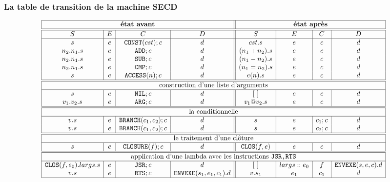 \documentclass[11pt]{book}
\begin{document}
\subsubsection{La table de transition de la machine SECD}
\begin{footnotesize}
\[
\begin{array}{|c|c|c|c || c|c|c|c|}
  \hline
  \multicolumn{4}{|c||}{\textbf{état avant}} & \multicolumn{4}{c|}{\textbf{état après}} \\
  \hline \hline
  S & E & C & D & S & E & C & D \\
  \hline
  
  s         & e & \texttt{CONST}(cst); c & d                & cst.s         & e & c &  d \\
  n_2.n_1.s & e & \texttt{ADD}; c        & d                & (n_1 + n_2).s & e & c &  d \\
  n_2.n_1.s & e & \texttt{SUB}; c        & d                & (n_1 - n_2).s & e & c &  d \\
  n_2.n_1.s & e & \texttt{CMP}; c        & d                & (n_1 = n_2).s & e & c &  d \\
        s   & e & \mathtt{ACCESS}(n);c   & d                & e(n).s        & e & c &  d \\ 
  \hline \hline
  \multicolumn{8}{|c|}{\textrm{construction d'une liste d'arguments}} \\
  \hline
  s         & e & \mathtt{NIL}; c        & d                & [\ ]   & e & c &  d \\
  v_1.v_2.s & e & \mathtt{ARG}; c        & d                & v_1 @ v_2 . s & e & c &  d \\
  \hline \hline
  \multicolumn{8}{|c|}{\textrm{la conditionnelle}} \\
  \hline
  v.s       & e & \mathtt{BRANCH}(c_1, c_2);c & d             & s             & e & c_1;c & d \\
  v.s       & e & \mathtt{BRANCH}(c_1, c_2);c & d             & s             & e & c_2;c & d \\
  \hline \hline
  \multicolumn{8}{|c|}{\textrm{le traitement d'une clôture}} \\
  \hline
  s         & e &  \mathtt{CLOSURE}(f);c      & d             & \mathtt{CLOS}(f,e) & e & c & d \\
  \hline \hline 
  \multicolumn{8}{|c|}{\textrm{application d'une lambda avec les instructions }\texttt{JSR,RTS}} \\
  \hline 
  \mathtt{CLOS}(f,e_0).largs.s & e & \mathtt{JSR};c & d       & [\ ] & largs::e_0 & f & \mathtt{ENVEXE}(s,e,c).d \\
  v.s & e & \mathtt{RTS};c & \mathtt{ENVEXE}(s_1, e_1, c_1).d & v.s_1 & e_1 & c_1 & d \\     
  \hline
\end{array}
\]

\end{footnotesize}
\end{document}
